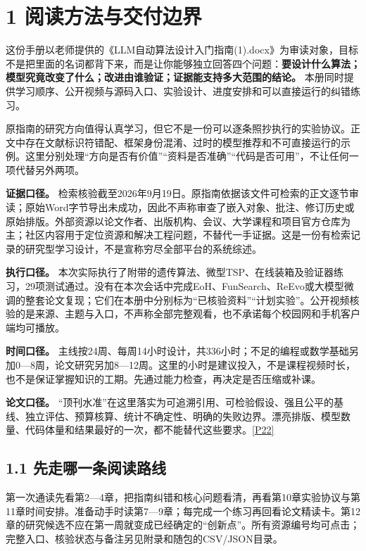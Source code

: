\section{1
阅读方法与交付边界}\label{ux9605ux8bfbux65b9ux6cd5ux4e0eux4ea4ux4ed8ux8fb9ux754c}

这份手册以老师提供的《LLM自动算法设计入门指南(1).docx》为审读对象，目标不是把里面的名词都背下来，而是让你能够独立回答四个问题：\textbf{要设计什么算法；模型究竟改变了什么；改进由谁验证；证据能支持多大范围的结论。}
本册同时提供学习顺序、公开视频与源码入口、实验设计、进度安排和可以直接运行的纠错练习。

原指南的研究方向值得认真学习，但它不是一份可以逐条照抄执行的实验协议。正文中存在文献标识符错配、框架身份混淆、过时的模型推荐和不可直接运行的示例。这里分别处理``方向是否有价值''``资料是否准确''``代码是否可用''，不让任何一项代替另外两项。

\textbf{证据口径。}
检索核验截至2026年9月19日。原指南依据该文件可检索的正文逐节审读；原始Word字节导出未成功，因此不声称审查了嵌入对象、批注、修订历史或原始排版。外部资源以论文作者、出版机构、会议、大学课程和项目官方仓库为主；社区内容用于定位资源和解决工程问题，不替代一手证据。这是一份有检索记录的研究型学习设计，不是宣称穷尽全部平台的系统综述。

\textbf{执行口径。}
本次实际执行了附带的遗传算法、微型TSP、在线装箱及验证器练习，29项测试通过。没有在本次会话中完成EoH、FunSearch、ReEvo或大模型微调的整套论文复现；它们在本册中分别标为``已核验资料''``计划实验''。公开视频核验的是来源、主题与入口，不声称全部完整观看，也不承诺每个校园网和手机客户端均可播放。

\textbf{时间口径。}
主线按24周、每周14小时设计，共336小时；不足的编程或数学基础另加0---8周，论文研究另加8---12周。这里的小时是建议投入，不是课程视频时长，也不是保证掌握知识的工期。先通过能力检查，再决定是否压缩或补课。

\textbf{论文口径。}
``顶刊水准''在这里落实为可追溯引用、可检验假设、强且公平的基线、独立评估、预算核算、统计不确定性、明确的失败边界。漂亮排版、模型数量、代码体量和结果最好的一次，都不能替代这些要求。\href{https://jmlr.org/papers/v22/20-303.html}{{[}P22{]}}

\subsection{1.1
先走哪一条阅读路线}\label{ux5148ux8d70ux54eaux4e00ux6761ux9605ux8bfbux8defux7ebf}

第一次通读先看第2---4章，把指南纠错和核心问题看清，再看第10章实验协议与第11章时间安排。准备动手时读第7---9章；每完成一个练习再回看论文精读卡。第12章的研究候选不应在第一周就变成已经确定的``创新点''。所有资源编号均可点击；完整入口、核验状态与备注另见附录和随包的CSV/JSON目录。

